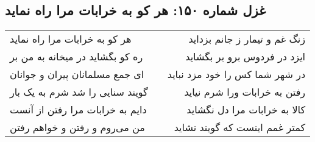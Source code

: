 \begin{center}
\section*{غزل شماره ۱۵۰: هر کو به خرابات مرا راه نماید}
\label{sec:150}
\begin{longtable}{l p{0.5cm} r}
هر کو به خرابات مرا راه نماید
&&
زنگ غم و تیمار ز جانم بزداید
\\
ره کو بگشاید در میخانه به من بر
&&
ایزد در فردوس برو بر بگشاید
\\
ای جمع مسلمانان پیران و جوانان
&&
در شهر شما کس را خود مزد نباید
\\
گویند سنایی را شد شرم به یک بار
&&
رفتن به خرابات ورا شرم نیاید
\\
دایم به خرابات مرا رفتن از آنست
&&
کالا به خرابات مرا دل نگشاید
\\
من می‌روم و رفتن و خواهم رفتن
&&
کمتر غمم اینست که گویند نشاید
\\
\end{longtable}
\end{center}
